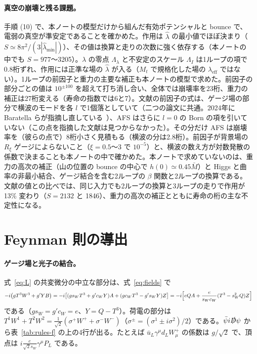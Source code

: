 \documentclass[a4paper,10pt]{ltjsarticle}
\newcommand{\sw}{s_W}
\newcommand{\cw}{c_W}
\begin{document}
\paragraph{真空の崩壊と残る課題。}手順 (10) で、本ノートの模型だけから組んだ有効ポテンシャルと bounce で、電弱の真空が準安定であることを確かめた。作用は $\hat\lambda$ の最小値でほぼ決まり（$S\simeq8\pi^2/(3|\hat\lambda_{\min}|)$）、その値は換算と走りの次数に強く依存する（本ノートの中でも $S=977$〜3205）。$\lambda$ の零点 $\Lambda_\lambda$ と不安定のスケール $\Lambda_I$ は1ループの項で0.8桁ずれ、作用には正準な場の $\hat\lambda$ が入る（$M_t$ で規格化した場の $\lambda_{\mathrm{eff}}$ ではない）。1ループの前因子と重力の主要な補正も本ノートの模型で求めた。前因子の部分ごとの値は $10^{\pm100}$ を超えて打ち消し合い、全体では崩壊率を23桁、重力の補正は27桁変える（寿命の指数では6と7）。文献の前因子の式は、ゲージ場の部分で横波のモードを各 $l$ で1個落としていて（二つの論文に共通。2024年に Baratella らが指摘し直している~\cite{bnstu24}）、AFS はさらに $l=0$ の Born の項を引いていない（この点を指摘した文献は見つからなかった）。その分だけ AFS は崩壊率を（彼らの点で）8桁小さく見積もる（横波の分は2.8桁）。前因子が背景場の $R_\xi$ ゲージによらないこと（$\xi=0.5$〜3 で $10^{-5}$）と、横波の数え方が対数発散の係数で決まることも本ノートの中で確かめた。本ノートで求めていないのは、重力の高次の補正（山の位置の bounce の中心で $h(0)\simeq0.45\bar M$）と Higgs と曲率の非最小結合、ゲージ結合を含む2ループの $\beta$ 関数と2ループの換算である。文献の値との比べでは、同じ入力でも2ループの換算と3ループの走りで作用が13\% 変わり（$S=2132$ と 1846）、重力の高次の補正とともに寿命の桁の主な不定性になる。

\appendix

\section{Feynman 則の導出}\label{app:rules}

\paragraph{ゲージ場と光子の結合。}式~\eqref{eq:L} の共変微分の中立な部分は、式~\eqref{eq:fields} で
\begin{equation*}
-i\bigl(gT^3W^3+g'YB\bigr)=-i\bigl[(g\sw T^3+g'\cw Y)A+(g\cw T^3-g'\sw Y)Z\bigr]=-i\Bigl[eQA+\frac{e}{\sw\cw}(T^3-\sw^2Q)Z\Bigr]
\end{equation*}
である（$g\sw=g'\cw=e$、$Y=Q-T^3$）。荷電の部分は $T^1W^1+T^2W^2=\frac1{\sqrt2}(\sigma^+W^++\sigma^-W^-)$（$\sigma^\pm=(\sigma^1\pm i\sigma^2)/2$）である。$\bar\psi i\slashed D\psi$ から表~\ref{tab:rules-f} の上の4行が出る。たとえば $\bar u_L\gamma^\mu d_LW^+_\mu$ の係数は $g/\sqrt2$ で、頂点は $i\frac{e}{\sqrt2\sw}\gamma^\mu P_L$ である。
\end{document}
